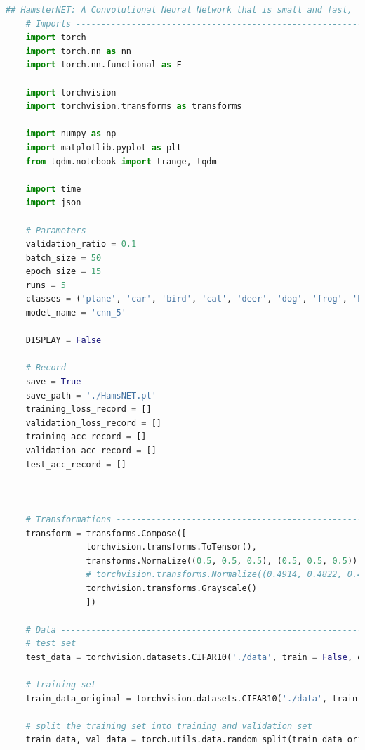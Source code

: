 \documentclass[3p,times,procedia]{elsarticle}
\begin{document}
\begin{lstlisting}[language=Python]
    ## HamsterNET: A Convolutional Neural Network that is small and fast, like a hamster running on a wheel.
    # Imports -------------------------------------------------------------------------------#
    import torch
    import torch.nn as nn
    import torch.nn.functional as F
    
    import torchvision
    import torchvision.transforms as transforms
    
    import numpy as np
    import matplotlib.pyplot as plt
    from tqdm.notebook import trange, tqdm
    
    import time
    import json
    
    # Parameters --------------------------------------------------------------------------#
    validation_ratio = 0.1
    batch_size = 50
    epoch_size = 15
    runs = 5
    classes = ('plane', 'car', 'bird', 'cat', 'deer', 'dog', 'frog', 'horse', 'ship', 'truck')
    model_name = 'cnn_5'
    
    DISPLAY = False
    
    # Record ---------------------------------------------------------------------------------#
    save = True
    save_path = './HamsNET.pt'
    training_loss_record = []
    validation_loss_record = []
    training_acc_record = []
    validation_acc_record = []
    test_acc_record = []
    
    
    
    # Transformations ------------------------------------------------------------------------#
    transform = transforms.Compose([
                torchvision.transforms.ToTensor(),
                transforms.Normalize((0.5, 0.5, 0.5), (0.5, 0.5, 0.5)),
                # torchvision.transforms.Normalize((0.4914, 0.4822, 0.4465), (0.247, 0.243, 0.261)),
                torchvision.transforms.Grayscale()
                ])
    
    # Data ---------------------------------------------------------------------------------#
    # test set
    test_data = torchvision.datasets.CIFAR10('./data', train = False, download = True, transform = transform)
    
    # training set
    train_data_original = torchvision.datasets.CIFAR10('./data', train = True, download = True,transform = transform)
    
    # split the training set into training and validation set
    train_data, val_data = torch.utils.data.random_split(train_data_original, [int(len(train_data_original)*(1-validation_ratio)), int(len(train_data_original)*validation_ratio)])
    

\end{lstlisting}
\end{document}
